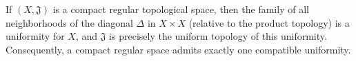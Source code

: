 If $(X, \mathfrak{J})$ is a compact regular topological space, then the family of all neighborhoods of the diagonal $\Delta$ in $X \times X$ (relative to the product topology) is a uniformity for $X$, and $\mathfrak{J}$ is precisely the uniform topology of this uniformity. Consequently, a compact regular space admits exactly one compatible uniformity.
